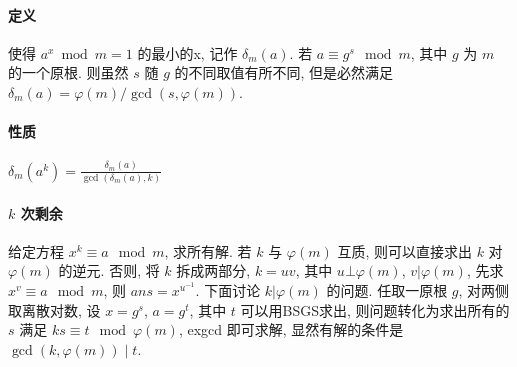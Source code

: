 
\paragraph{定义} 使得 $a^x \bmod m=1$ 的最小的x, 记作 $\delta_m(a)$.
若 $a\equiv g^s \mod m$, 其中 $g$ 为 $m$ 的一个原根.
则虽然 $s$ 随 $g$ 的不同取值有所不同, 但是必然满足 $\delta_m(a)=\varphi(m)/\gcd(s,\varphi(m))$.
\paragraph{性质} $\delta_m(a^k)=\frac{\delta_m(a)}{\gcd(\delta_m(a),k)}$
\paragraph{$k$ 次剩余} 给定方程 $x^k\equiv a \mod m$, 求所有解.
若 $k$ 与 $\varphi(m)$ 互质, 
则可以直接求出 $k$ 对 $\varphi(m)$ 的逆元.
否则, 将 $k$ 拆成两部分, $k=uv$,
其中 $u\bot \varphi(m)$, $v|\varphi(m)$,
先求 $x^v\equiv a \mod m$,
则 $ans=x^{u^{-1}}$.
下面讨论 $k|\varphi(m)$ 的问题.
任取一原根 $g$, 对两侧取离散对数,
设 $x=g^s$, $a=g^t$, 其中 $t$ 可以用BSGS求出,
则问题转化为求出所有的 $s$ 满足 $ks\equiv t \mod \varphi(m)$,
exgcd 即可求解, 显然有解的条件是 $\gcd(k,\varphi(m)) \mid t$.
